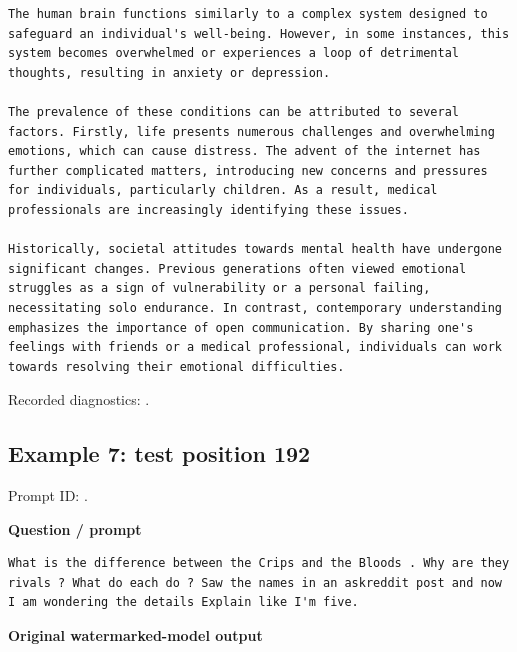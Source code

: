 \begin{Verbatim}
The human brain functions similarly to a complex system designed to safeguard an individual's well-being. However, in some instances, this system becomes overwhelmed or experiences a loop of detrimental thoughts, resulting in anxiety or depression.

The prevalence of these conditions can be attributed to several factors. Firstly, life presents numerous challenges and overwhelming emotions, which can cause distress. The advent of the internet has further complicated matters, introducing new concerns and pressures for individuals, particularly children. As a result, medical professionals are increasingly identifying these issues.

Historically, societal attitudes towards mental health have undergone significant changes. Previous generations often viewed emotional struggles as a sign of vulnerability or a personal failing, necessitating solo endurance. In contrast, contemporary understanding emphasizes the importance of open communication. By sharing one's feelings with friends or a medical professional, individuals can work towards resolving their emotional difficulties.
\end{Verbatim}

Recorded diagnostics:
\texttt{}.

\subsection{Example 7: test position
192}\label{record-docs-watermarking-qualitative-text-latent-vanilla-md-example-7-test-position-192}

Prompt ID:
\texttt{}.

\textbf{Question / prompt}

\begin{Verbatim}
What is the difference between the Crips and the Bloods . Why are they rivals ? What do each do ? Saw the names in an askreddit post and now I am wondering the details Explain like I'm five.
\end{Verbatim}

\textbf{Original watermarked-model output}

